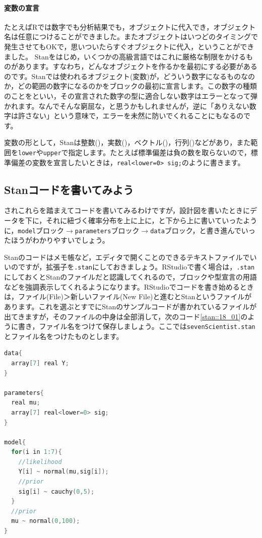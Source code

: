 \documentclass{ltjsbook}
\begin{document}
\paragraph{変数の宣言}
たとえばRでは数字でも分析結果でも，オブジェクトに代入でき，オブジェクト名は任意につけることができました。またオブジェクトはいつどのタイミングで発生させてもOKで，思いついたらすぐオブジェクトに代入，ということができました。
Stanをはじめ，いくつかの高級言語ではこれに厳格な制限をかけるものがあります。すなわち，どんなオブジェクトを作るかを最初にする必要があるのです。Stanでは使われるオブジェクト(変数)が，どういう数字になるものなのか，どの範囲の数字になるのかをブロックの最初に宣言します。この数字の種類のことをといい，その宣言された数字の型に適合しない数字はエラーとなって弾かれます。なんでそんな窮屈な，と思うかもしれませんが，逆に「ありえない数字は許さない」という意味で，エラーを未然に防いでくれることにもなるのです。

変数の形として，Stanは整数()，実数()，ベクトル()，行列()などがあり，また範囲を\texttt{lower}や\texttt{upper}で指定します。たとえば標準偏差は負の数を取らないので，標準偏差の変数を宣言したいときは，\verb|real<lower=0> sig;|のように書きます。
\subsection{Stanコードを書いてみよう}
されこれらを踏まえてコードを書いてみるわけですが，設計図を書いたときにデータを下に，それに紐づく確率分布を上に上に，と下から上に書いていったように，\texttt{model}ブロック$\to$\texttt{parameters}ブロック$\to$\texttt{data}ブロック，と書き進んでいったほうがわかりやすいでしょう。

Stanのコードはメモ帳など，エディタで開くことのできるテキストファイルでいいのですが，拡張子を\texttt{.stan}にしておきましょう。RStudioで書く場合は，\texttt{.stan}にしておくとStanのファイルだと認識してくれるので，ブロックや型宣言の用語などを強調表示してくれるようになります。RStudioでコードを書き始めるときは，ファイル(File)＞新しいファイル(New File)と進むとStanというファイルがあります。これを選ぶとすでにStanのサンプルコードが書かれているファイルが出てきますが，そのファイルの中身は全部消して，次のコード\ref{stan::18_01}のように書き，ファイル名をつけて保存しましょう。ここでは\texttt{sevenScientist.stan} とファイル名をつけたものとします。

\begin{lstlisting}[language=C++,label={stan::18_01},caption={7人の科学者コード}]
data{
  array[7] real Y;
}

parameters{
  real mu;
  array[7] real<lower=0> sig;
}

model{
  for(i in 1:7){
    //likelihood
    Y[i] ~ normal(mu,sig[i]);
    //prior
    sig[i] ~ cauchy(0,5);
  }
  //prior
  mu ~ normal(0,100);
}

\end{lstlisting}
\end{document}
